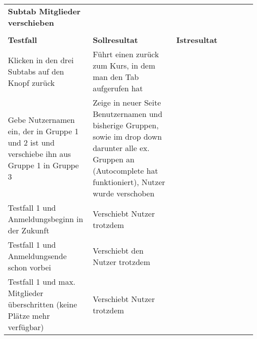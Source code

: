 \begin{table}[]
\begin{tabular}{p{6cm}p{7cm}p{3cm}llll}
	
			\textbf{Subtab Mitglieder verschieben}                                                                                                        &                                                                                                                                                                  &             &  &  &  \\
		&                                                                                                                                                                  &             &  &  &  \\
			\textbf{Testfall }                                                                                                                            &       	\textbf{Sollresultat}                                                                                                                                                           &      	\textbf{Istresultat}       &  &  &  \\
		Klicken in den drei Subtabs auf den Knopf zurück                                                                                     & Führt einen zurück zum Kurs, in dem man den Tab aufgerufen hat                                                                                                    & \checkmark           &  &  &  \\
		Gebe Nutzernamen ein, der in Gruppe 1 und 2 ist und verschiebe ihn aus Gruppe 1 in Gruppe 3                                           & Zeige in neuer Seite Benutzernamen und bisherige Gruppen, sowie im drop down darunter alle ex. Gruppen an (Autocomplete hat funktioniert), Nutzer wurde verschoben & \checkmark           &  &  &  \\
		Testfall 1 und Anmeldungsbeginn in der Zukunft                                                                                       & Verschiebt Nutzer trotzdem                                                                                                                                       & \checkmark           &  &  &  \\
		Testfall 1 und Anmeldungsende schon vorbei                                                                                           & Verschiebt den Nutzer trotzdem                                                                                                                                   & \checkmark           &  &  &  \\
		Testfall 1 und max. Mitglieder überschritten (keine Plätze mehr verfügbar)                                                           & Verschiebt Nutzer trotzdem                                                                                                                                       & \checkmark           &  &  &  \\

\end{tabular}
\end{table}
